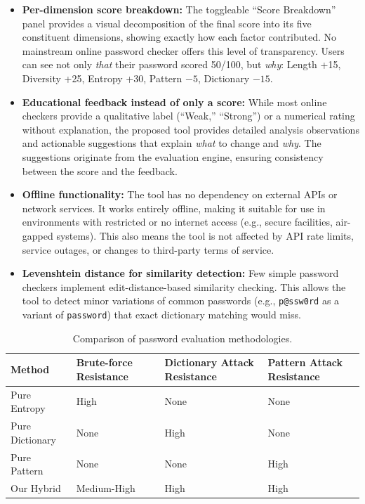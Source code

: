 \begin{itemize}
    \item \textbf{Per-dimension score breakdown:} The toggleable ``Score Breakdown'' panel provides a visual decomposition of the final score into its five constituent dimensions, showing exactly how each factor contributed. No mainstream online password checker offers this level of transparency. Users can see not only \textit{that} their password scored 50/100, but \textit{why}: Length +15, Diversity +25, Entropy +30, Pattern $-5$, Dictionary $-15$.

    \item \textbf{Educational feedback instead of only a score:} While most online checkers provide a qualitative label (``Weak,'' ``Strong'') or a numerical rating without explanation, the proposed tool provides detailed analysis observations and actionable suggestions that explain \textit{what} to change and \textit{why}. The suggestions originate from the evaluation engine, ensuring consistency between the score and the feedback.

    \item \textbf{Offline functionality:} The tool has no dependency on external APIs or network services. It works entirely offline, making it suitable for use in environments with restricted or no internet access (e.g., secure facilities, air-gapped systems). This also means the tool is not affected by API rate limits, service outages, or changes to third-party terms of service.

    \item \textbf{Levenshtein distance for similarity detection:} Few simple password checkers implement edit-distance-based similarity checking. This allows the tool to detect minor variations of common passwords (e.g., \texttt{p@ssw0rd} as a variant of \texttt{password}) that exact dictionary matching would miss.
\end{itemize}

\begin{table}[H]
\centering
\caption{Comparison of password evaluation methodologies.}
\label{tab:methodology}
\small
\begin{tabularx}{\textwidth}{>{\raggedright\arraybackslash}p{3cm} >{\centering\arraybackslash}p{2.5cm} >{\centering\arraybackslash}p{2.5cm} >{\centering\arraybackslash}p{2.5cm}}
\toprule
\textbf{Method} & \textbf{Brute-force Resistance} & \textbf{Dictionary Attack Resistance} & \textbf{Pattern Attack Resistance} \\
\midrule
Pure Entropy & High & None & None \\
Pure Dictionary & None & High & None \\
Pure Pattern & None & None & High \\
Our Hybrid & Medium-High & High & High \\
\bottomrule
\end{tabularx}
\end{table}

